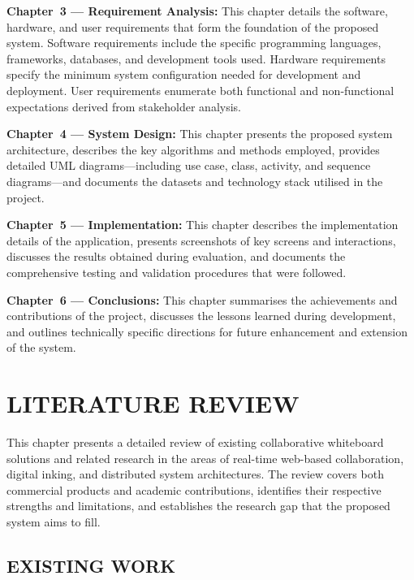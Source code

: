 \documentclass[12pt,a4paper]{report}
\begin{document}
\textbf{Chapter~3 --- Requirement Analysis:} This chapter details the software, hardware, and user requirements that form the foundation of the proposed system. Software requirements include the specific programming languages, frameworks, databases, and development tools used. Hardware requirements specify the minimum system configuration needed for development and deployment. User requirements enumerate both functional and non-functional expectations derived from stakeholder analysis.

\textbf{Chapter~4 --- System Design:} This chapter presents the proposed system architecture, describes the key algorithms and methods employed, provides detailed UML diagrams---including use case, class, activity, and sequence diagrams---and documents the datasets and technology stack utilised in the project.

\textbf{Chapter~5 --- Implementation:} This chapter describes the implementation details of the application, presents screenshots of key screens and interactions, discusses the results obtained during evaluation, and documents the comprehensive testing and validation procedures that were followed.

\textbf{Chapter~6 --- Conclusions:} This chapter summarises the achievements and contributions of the project, discusses the lessons learned during development, and outlines technically specific directions for future enhancement and extension of the system.


\chapter{LITERATURE REVIEW}
\thispagestyle{empty}

This chapter presents a detailed review of existing collaborative whiteboard solutions and related research in the areas of real-time web-based collaboration, digital inking, and distributed system architectures. The review covers both commercial products and academic contributions, identifies their respective strengths and limitations, and establishes the research gap that the proposed system aims to fill.

\section{EXISTING WORK}
\end{document}

